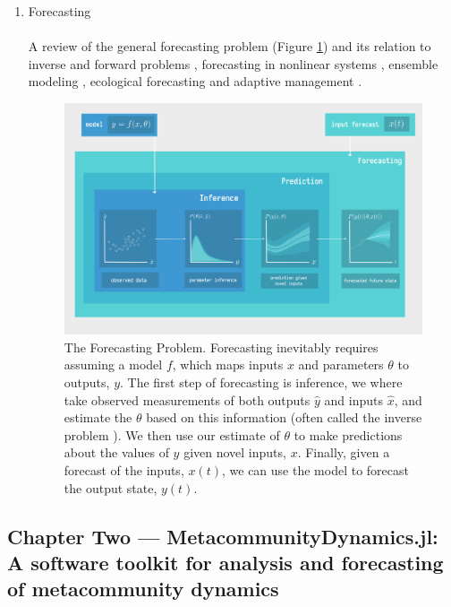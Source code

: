 \documentclass[]{article}
\begin{document}
\begin{enumerate}
    \item Forecasting  \\ \hfill \\
        A review of the general forecasting problem (Figure \ref{fig:inference_prediction_forecasting}) and its relation to inverse and forward problems \cite{stouffer_all_2019},  forecasting in nonlinear systems
        \cite{crutchfield_semantics}, ensemble modeling \cite{parker2013ensemble}, ecological forecasting  and adaptive management \cite{dietze_ecological_2017, dietze_iterative_2018}.
        
        \begin{figure}[H]
    \centering
    \includegraphics[width=17cm]{figs/inf_prediction_forecasting.png}
    \caption{The Forecasting Problem. Forecasting inevitably requires assuming a model $f$, which maps inputs $x$ and parameters $\theta$ to outputs, $y$. The first step of forecasting is inference, we where take observed measurements of both outputs $\hat{y}$ and inputs $\hat{x}$, and estimate the $\theta$ based on this information (often called the inverse problem \cite{stouffer_all_2019}). We then use our estimate of $\theta$ to make predictions about the values of $y$ given novel inputs, $x$. Finally, given a forecast of the inputs, $x(t)$, we can use the model to forecast the output state, $y(t)$. }
    \label{fig:inference_prediction_forecasting}
\end{figure}

\end{enumerate}


\subsection{Chapter Two --- MetacommunityDynamics.jl: A software toolkit for analysis and forecasting of metacommunity dynamics }
\end{document}

